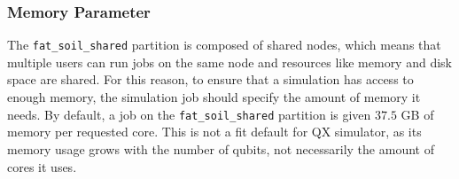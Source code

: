 \subsubsection{Memory Parameter}
The \texttt{fat_soil_shared} partition is composed of shared nodes, which means that multiple users can run jobs on the same node and resources like memory and disk space are shared.
For this reason, to ensure that a simulation has access to enough memory, the simulation job should specify the amount of memory it needs.
By default, a job on the \texttt{fat_soil_shared} partition is given $37.5$ GB of memory per requested core.
This is not a fit default for QX simulator, as its memory usage grows with the number of qubits, not necessarily the amount of cores it uses.

